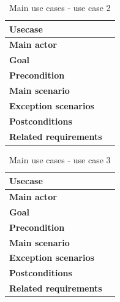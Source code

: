 \begin{table}[H]
	\centering
	\begin{tabularx}{\linewidth}{l|X}
		\textbf{Usecase}      &  \\ \hline
		\textbf{Main actor}  & \\ \hline
		\textbf{Goal}   &  \\ \hline
		\textbf{Precondition}     &  \\ \hline
		\textbf{Main scenario}    &  \\ \hline
		\textbf{Exception scenarios} & \\ \hline
		\textbf{Postconditions} & \\ \hline
		\textbf{Related requirements} & \\ \hline
	\end{tabularx}
	\caption{Main use cases - use case 2}
	\label{tbl:uc2}
\end{table}

\begin{table}[H]
	\centering
	\begin{tabularx}{\linewidth}{l|X}
		\textbf{Usecase}      &  \\ \hline
		\textbf{Main actor}  & \\ \hline
		\textbf{Goal}   &  \\ \hline
		\textbf{Precondition}     &  \\ \hline
		\textbf{Main scenario}    &  \\ \hline
		\textbf{Exception scenarios} & \\ \hline
		\textbf{Postconditions} & \\ \hline
		\textbf{Related requirements} & \\ \hline
	\end{tabularx}
	\caption{Main use cases - use case 3}
	\label{tbl:uc3}
\end{table}
